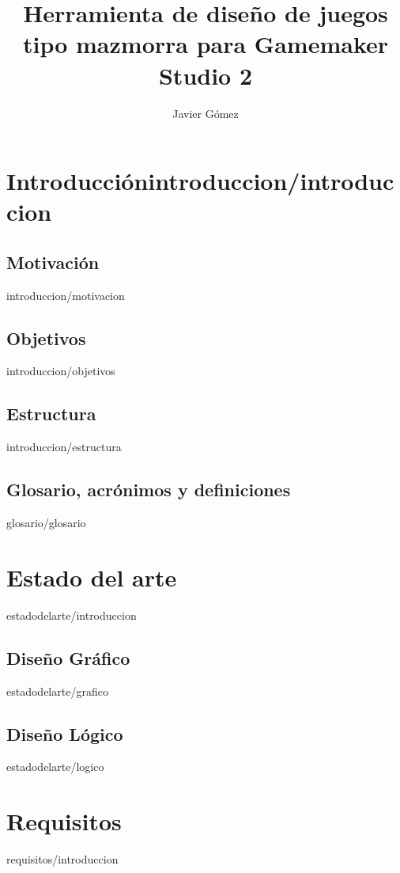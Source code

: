 \documentclass[epsbased,copyright,final,printable,covers,extendedindex,firstnumbered,tfg,gnuplot]{tfgtfmthesisuam}
\title{Herramienta de diseño de juegos tipo mazmorra para Gamemaker Studio 2}
\subtitle{}
\author{Javier Gómez}
\begin{document}
\show\newdefinition

\chapter{Introducción\label{CAP:INTRODUCCION}{introduccion/introduccion}}
	\section{Motivación\label{SEC:MOTIVACION}}{introduccion/motivacion}
	\section{Objetivos\label{SEC:OBJETIVOS}}{introduccion/objetivos}
	\section{Estructura\label{SEC:ESTRUCTURA}}{introduccion/estructura}
	\section{Glosario, acrónimos y definiciones\label{SEC:GLOSARIO}}{glosario/glosario}
	
\chapter{Estado del arte\label{CAP:ESTADODELARTE}}{estadodelarte/introduccion}
	\section{Diseño Gráfico\label{SEC:DISENOGRAFICO}}{estadodelarte/grafico}
	\section{Diseño Lógico\label{SEC:DISENOLOGICO}}{estadodelarte/logico}
	
\chapter{Requisitos\label{CAP:REQUISITOS}}{requisitos/introduccion}
\end{document}

